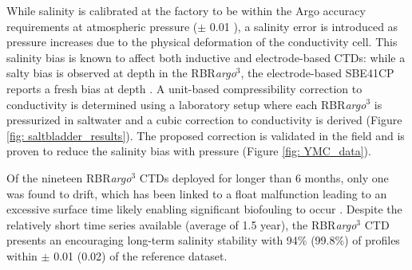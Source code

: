 \documentclass{ametsocV6.1}
\begin{document}
While salinity is calibrated at the factory to be within the Argo accuracy requirements at atmospheric pressure ($\pm$ 0.01 ), a salinity error is introduced as pressure increases due to the physical deformation of the conductivity cell.  
This salinity bias is known to affect both inductive and electrode-based CTDs: while a salty bias is observed at depth in the RBR\textit{argo}$^3$, the electrode-based SBE41CP reports a fresh bias at depth \citep{SBEpressure}. 
A unit-based compressibility correction to conductivity is determined using a laboratory setup where each RBR\textit{argo}$^3$ is pressurized in saltwater and a cubic correction to conductivity is derived (Figure \ref{fig: saltbladder_results}). 
The proposed correction is validated in the field and is proven to reduce the salinity bias with pressure (Figure \ref{fig: YMC_data}).

Of the nineteen RBR\textit{argo}$^3$ CTDs deployed for longer than 6 months, only one was found to drift, which has been linked to a float malfunction leading to an excessive surface time likely enabling significant biofouling to occur \citep[Figure \ref{fig: stability};][]{RBRdrift}. 
Despite the relatively short time series available (average of 1.5 year), the RBR\textit{argo}$^3$ CTD presents an encouraging long-term salinity stability with 94\% (99.8\%) of profiles within $\pm$ 0.01 (0.02)  of the reference dataset.
\end{document}
